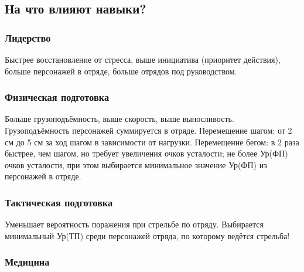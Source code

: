 \documentclass[
]{article}
\begin{document}
\subsection*{На что влияют
навыки?}\label{ux43dux430-ux447ux442ux43e-ux432ux43bux438ux44fux44eux442-ux43dux430ux432ux44bux43aux438}

\subsubsection*{Лидерство}\label{ux43bux438ux434ux435ux440ux441ux442ux432ux43e}

Быстрее восстановление от стресса, выше инициатива (приоритет действия),
больше персонажей в отряде, больше отрядов под руководством.

\subsubsection*{Физическая
подготовка}\label{ux444ux438ux437ux438ux447ux435ux441ux43aux430ux44f-ux43fux43eux434ux433ux43eux442ux43eux432ux43aux430}

Больше грузоподъёмность, выше скорость, выше выносливость.
Грузоподъёмность персонажей суммируется в отряде. Перемещение шагом: от
2 см до 5 см за ход шагом в зависимости от нагрузки. Перемещение бегом:
в 2 раза быстрее, чем шагом, но требует увеличения очков усталости; не
более Ур(ФП) очков усталости, при этом выбирается минимальное значение
Ур(ФП) из персонажей в отряде.

\subsubsection*{Тактическая
подготовка}\label{ux442ux430ux43aux442ux438ux447ux435ux441ux43aux430ux44f-ux43fux43eux434ux433ux43eux442ux43eux432ux43aux430}

Уменьшает вероятность поражения при стрельбе по отряду. Выбирается
минимальный Ур(ТП) среди персонажей отряда, по которому ведётся
стрельба!

\subsubsection*{Медицина}\label{ux43cux435ux434ux438ux446ux438ux43dux430}
\end{document}
